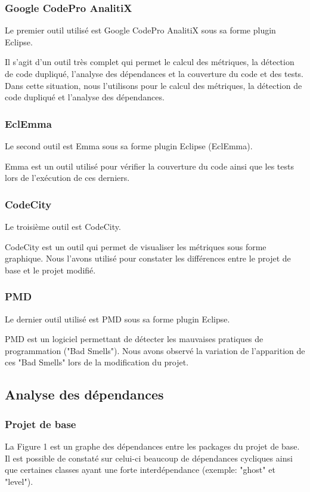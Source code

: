 \documentclass[a4paper,12pt]{report} %
\begin{document}
\subsubsection{Google CodePro AnalitiX}
Le premier outil utilisé est Google CodePro AnalitiX sous sa forme
plugin Eclipse.

Il s'agit d'un outil très complet qui permet le calcul des métriques,
la détection de code dupliqué, l'analyse des dépendances et la couverture
du code et des tests. Dans cette situation, nous l'utilisons pour le calcul des métriques,
la détection de code dupliqué et l'analyse des dépendances.

\subsubsection{EclEmma}
Le second outil est Emma sous sa forme plugin Eclipse (EclEmma).

Emma est un outil utilisé pour vérifier la couverture du code ainsi
que les tests lors de l'exécution de ces derniers.

\subsubsection{CodeCity}
Le troisième outil est CodeCity.

CodeCity est un outil qui permet de visualiser les métriques sous
forme graphique. Nous l'avons utilisé pour constater les différences
entre le projet de base et le projet modifié.

\subsubsection{PMD}
Le dernier outil utilisé est PMD sous sa forme plugin Eclipse.

PMD est un logiciel permettant de détecter les mauvaises pratiques
de programmation ("Bad Smells"). Nous avons observé la variation
de l'apparition de ces "Bad Smells" lors de la modification du
projet.

\subsection{Analyse des dépendances}
\subsubsection{Projet de base}
La Figure 1 est un graphe des dépendances entre les packages
du projet de base. Il est possible de constaté sur celui-ci beaucoup de
dépendances cycliques ainsi que certaines classes ayant une forte interdépendance (exemple: "ghost" et "level").
\end{document}
